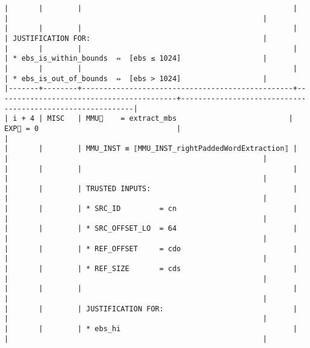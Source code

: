 \documentclass[varwidth=\maxdimen,margin=0.5cm,multi={verbatim}]{standalone}
\begin{document}
\begin{verbatim}
|       |        |                                                 |                                          |                                                           |
|       |        |                                                 |                                          | JUSTIFICATION FOR:                                        |
|       |        |                                                 |                                          | * ebs_is_within_bounds  ⇔  [ebs ≤ 1024]                   |
|       |        |                                                 |                                          | * ebs_is_out_of_bounds  ⇔  [ebs > 1024]                   |
|-------+--------+-------------------------------------------------+------------------------------------------+-----------------------------------------------------------|
| i + 4 | MISC   | MMU🏴    = extract_mbs                          | EXP🏴 = 0                                |                                                           |
|       |        | MMU_INST ≡ ⟦MMU_INST_rightPaddedWordExtraction⟧ |                                          |                                                           |
|       |        |                                                 |                                          |                                                           |
|       |        | TRUSTED INPUTS:                                 |                                          |                                                           |
|       |        | * SRC_ID         = cn                           |                                          |                                                           |
|       |        | * SRC_OFFSET_LO  = 64                           |                                          |                                                           |
|       |        | * REF_OFFSET     = cdo                          |                                          |                                                           |
|       |        | * REF_SIZE       = cds                          |                                          |                                                           |
|       |        |                                                 |                                          |                                                           |
|       |        | JUSTIFICATION FOR:                              |                                          |                                                           |
|       |        | * ebs_hi                                        |                                          |                                                           |

\end{verbatim}
\end{document}
